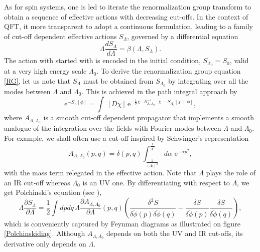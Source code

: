 \documentclass[12pt,here,feynmf]{article}
\begin{document}
As for spin systems, one is led to iterate the renormalization group transform to obtain a sequence of effective actions with decreasing cut-offs. In the context of QFT, it more transparent to adopt a continuous formulation, leading to a family of cut-off dependent effective actions $S_{\Lambda}$, governed by a differential equation     
\begin{equation}
\Lambda\frac{dS_{\Lambda}}{d\Lambda}=\beta(\Lambda,S_{\Lambda}).
\label{RG}
\end{equation}
The action with started with is encoded in the initial condition, $S_{\Lambda_{0}}=S_{0}$, valid at a very high energy scale $\Lambda_{0}$. To derive the renormalization group equation \eqref{RG}, let us note that $S_{\Lambda}$ must be obtained from $S_{\Lambda_{0}}$ by integrating over all the modes between $\Lambda$ and $\Lambda_{0}$. This is achieved in the path integral approach by
\begin{equation}  
\mbox{e}^{-S_{\Lambda}[\phi]}= \int\, [D\chi]\,\mathrm{e}^{-{\textstyle\frac{1}{2}}\chi\cdot A^{-1}_{\Lambda,\Lambda_{0}}\cdot\chi-S_{\Lambda_0}[\chi+\phi]},
\end{equation}
where $A_{\Lambda,\Lambda_{0}}$ is a smooth cut-off dependent propagator that implements a smooth analogue of the integration over the fields with Fourier modes between $\Lambda$ and $\Lambda_{0}$. For example, we shall often use a cut-off inspired by Schwinger's representation
\begin{equation}
{A_{\Lambda,\Lambda_{0}}}(p,q)=\delta(p,q)\int^{\frac{1}{\Lambda^{2}}}_{\frac{1}{(\Lambda_{0})^{2}}}\!\!d\alpha\,\,
\mathrm{e}^{-\alpha p^{2}},
\end{equation}
with the mass term relegated in the effective action. Note that $\Lambda$ plays the role of an IR cut-off whereas $\Lambda_{0}$ is an UV one. By differentiating with respect to $\Lambda$, we get Polchinski's equation (see \cite{Polchinski}), 
\begin{equation}
\Lambda\frac{\partial
S_{\Lambda}}{\partial\Lambda}=\frac{1}{2}\int\!dp dq\,
\Lambda\frac{\partial
A_{\Lambda,\Lambda_{0}}}{\partial\Lambda}(p,q)\left(
\frac{\delta^{2}S}{\delta\widetilde{\phi}(p)\delta\widetilde{\phi}(q)}- \frac{\delta
S}{\delta\widetilde{\phi}(p)} \frac{\delta S}{\delta\widetilde{\phi}(q)} \right),
\label{erge}
\end{equation}
which is conveniently captured by Feynman diagrams as illustrated on figure \ref{Polchinskidiag}. Although $A_{\Lambda,\Lambda_{0}}$ depends on both the UV and IR cut-offs,  its derivative only depends on $\Lambda$. 
\end{document}
